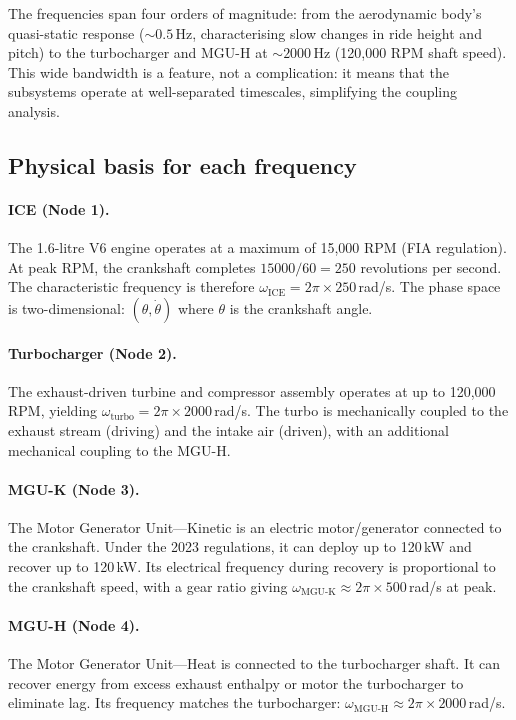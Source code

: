 \documentclass[twocolumn,10pt,a4paper]{article}
\theoremstyle{definition}
\theoremstyle{remark}
\begin{document}
The frequencies span four orders of magnitude: from the aerodynamic body's quasi-static response ($\sim 0.5$\,Hz, characterising slow changes in ride height and pitch) to the turbocharger and MGU-H at $\sim 2000$\,Hz (120,000 RPM shaft speed). This wide bandwidth is a feature, not a complication: it means that the subsystems operate at well-separated timescales, simplifying the coupling analysis.

\subsection{Physical basis for each frequency}

\paragraph{ICE (Node 1).} The 1.6-litre V6 engine operates at a maximum of 15,000 RPM (FIA regulation). At peak RPM, the crankshaft completes $15000/60 = 250$ revolutions per second. The characteristic frequency is therefore $\omega_{\mathrm{ICE}} = 2\pi \times 250$\,rad/s. The phase space is two-dimensional: $(\theta, \dot{\theta})$ where $\theta$ is the crankshaft angle.

\paragraph{Turbocharger (Node 2).} The exhaust-driven turbine and compressor assembly operates at up to 120,000 RPM, yielding $\omega_{\mathrm{turbo}} = 2\pi \times 2000$\,rad/s. The turbo is mechanically coupled to the exhaust stream (driving) and the intake air (driven), with an additional mechanical coupling to the MGU-H.

\paragraph{MGU-K (Node 3).} The Motor Generator Unit---Kinetic is an electric motor/generator connected to the crankshaft. Under the 2023 regulations, it can deploy up to 120\,kW and recover up to 120\,kW. Its electrical frequency during recovery is proportional to the crankshaft speed, with a gear ratio giving $\omega_{\mathrm{MGU\text{-}K}} \approx 2\pi \times 500$\,rad/s at peak.

\paragraph{MGU-H (Node 4).} The Motor Generator Unit---Heat is connected to the turbocharger shaft. It can recover energy from excess exhaust enthalpy or motor the turbocharger to eliminate lag. Its frequency matches the turbocharger: $\omega_{\mathrm{MGU\text{-}H}} \approx 2\pi \times 2000$\,rad/s.
\end{document}
